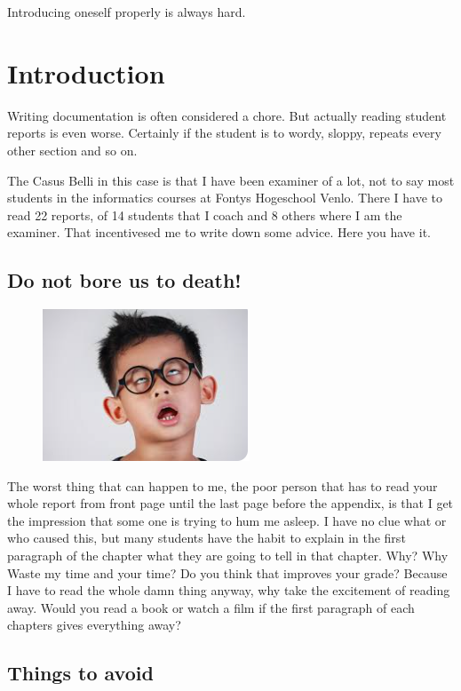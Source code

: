 \def\TheFile{ch01_intro.tex}

\begin{savequote}[15cm]
  \raggedleft
  \sffamily
  Introducing oneself properly is always hard.
\end{savequote}
\chapter{Introduction}

Writing documentation is often considered a chore. But actually reading student reports is even worse.
Certainly if the student is to wordy, sloppy, repeats every other section and so on.

The Casus Belli in this case is that I have been examiner of a lot,
not to say most students in the informatics courses at Fontys
Hogeschool Venlo. There I have to read 22 reports, of 14 students that
I coach and 8 others where I am the examiner. That incentivesed me to
write down some advice. Here you have it.

\section{Do not bore us to death!}

\begin{figure}
  \includegraphics[width=.25\textwidth]{images/boreme.png}
\end{figure}
The worst thing that can happen to me, the poor person that has to
read your whole report from front page until the last page before the
appendix, is that I get the impression that some one is trying to hum
me asleep.  I have no clue what or who caused this, but many students
have the habit to explain in the first paragraph of the chapter what
they are going to tell in that chapter. Why? Why Waste my time and your time? Do you think that improves your grade?
Because I have to read the whole damn thing anyway, why take the excitement of
reading away. Would you read a book or watch a film if the first
paragraph of each chapters gives everything away?

\section{Things to avoid}


